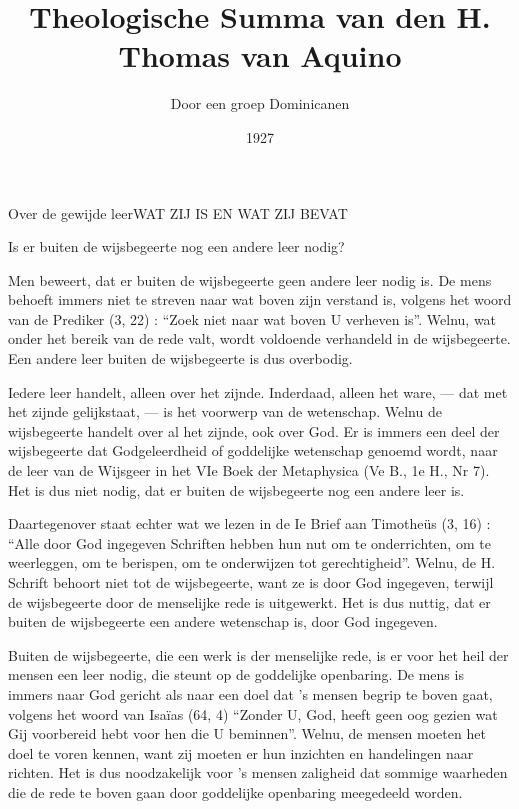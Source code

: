 \documentclass{summa}
\title{Theologische Summa van den H. Thomas van Aquino}
\author{Door een groep Dominicanen}
\date{1927}
\begin{document}
\maketitle
\setcounter{tocdepth}{1}
\tableofcontents


\begin{quaestio}{Over de gewijde leer}{WAT ZIJ IS EN WAT ZIJ BEVAT}


  \begin{articulus}{Is er buiten de wijsbegeerte nog een andere leer nodig?}


    \begin{objectiones}
    \item { Men beweert, dat er buiten de wijsbegeerte geen andere leer nodig is. De mens behoeft immers niet te streven naar wat boven zijn verstand is, volgens het woord van de Prediker (3, 22) : “Zoek niet naar wat boven U verheven is”. Welnu, wat onder het bereik van de rede valt, wordt voldoende verhandeld in de wijsbegeerte. Een andere leer buiten de wijsbegeerte is dus overbodig. }
    \item { Iedere leer handelt, alleen over het zijnde. Inderdaad, alleen het ware, — dat met het zijnde gelijkstaat, — is het voorwerp van de wetenschap. Welnu de wijsbegeerte handelt over al het zijnde, ook over God. Er is immers een deel der wijsbegeerte dat Godgeleerdheid of goddelijke wetenschap genoemd wordt, naar de leer van de Wijsgeer in het VIe Boek der Metaphysica (Ve B., 1e H., Nr 7). Het is dus niet nodig, dat er buiten de wijsbegeerte nog een andere leer is. }
    \end{objectiones}
    
    \begin {contra}
      Daartegenover staat echter wat we lezen in de Ie Brief aan Timotheüs (3, 16) : “Alle door God ingegeven Schriften hebben hun nut om te onderrichten, om te weerleggen, om te berispen, om te onderwijzen tot gerechtigheid”. Welnu, de H. Schrift behoort niet tot de wijsbegeerte, want ze is door God ingegeven, terwijl de wijsbegeerte door de menselijke rede is uitgewerkt. Het is dus nuttig, dat er buiten de wijsbegeerte een andere wetenschap is, door God ingegeven.
    \end {contra}
    
    \begin {respondeo}
      Buiten de wijsbegeerte, die een werk is der menselijke rede, is er voor het heil der mensen een leer nodig, die steunt op de goddelijke openbaring. De mens is immers naar God gericht als naar een doel dat ’s mensen begrip te boven gaat, volgens het woord van Isaïas (64, 4) “Zonder U, God, heeft geen oog gezien wat Gij voorbereid hebt voor hen die U beminnen”. Welnu, de mensen moeten het doel te voren kennen, want zij moeten er hun inzichten en handelingen naar richten. Het is dus noodzakelijk voor ’s mensen zaligheid dat sommige waarheden die de rede te boven gaan door goddelijke openbaring meegedeeld worden.  
      

\end{respondeo}
\end{articulus}
\end{quaestio}
\end{document}

